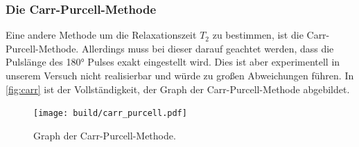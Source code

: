 \subsubsection{Die Carr-Purcell-Methode}
Eine andere Methode um die Relaxationszeit $T_2$ zu bestimmen, ist die Carr-Purcell-Methode.
Allerdings muss bei dieser darauf geachtet werden, dass die Pulslänge des 180° Pulses exakt
eingestellt wird.
Dies ist aber experimentell in unserem Versuch nicht realisierbar und würde zu großen
Abweichungen führen.
In \autoref{fig:carr} ist der Vollständigkeit, der Graph der Carr-Purcell-Methode abgebildet.
\begin{figure}
    \centering
    \texttt{[image: build/carr\_purcell.pdf]}
    \caption{Graph der Carr-Purcell-Methode.}
    \label{fig:carr}
\end{figure} 

